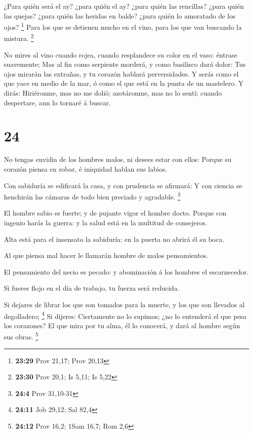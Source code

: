  ¿Para quién será el ay? ¿para quién el ay? ¿para quién las
rencillas? ¿para quién las quejas? ¿para quién las heridas en balde?
¿para quién lo amoratado de los ojos? \footnote{\textbf{23:29} Prov
  21,17; Prov 20,13}  Para los que se detienen mucho en el
vino, para los que van buscando la mistura. \footnote{\textbf{23:30}
  Prov 20,1; Is 5,11; Is 5,22}

 No mires al vino cuando rojea, cuando resplandece su color
en el vaso: éntrase suavemente;  Mas al fin como serpiente
morderá, y como basilisco dará dolor:  Tus ojos mirarán las
extrañas, y tu corazón hablará perversidades.  Y serás como
el que yace en medio de la mar, ó como el que está en la punta de un
mastelero.  Y dirás: Hiriéronme, mas no me dolió;
azotáronme, mas no lo sentí; cuando despertare, aun lo tornaré á buscar.

\hypertarget{section-23}{%
\section{24}\label{section-23}}

 No tengas envidia de los hombres malos, ni desees estar con
ellos:  Porque su corazón piensa en robar, é iniquidad
hablan sus labios.

 Con sabiduría se edificará la casa, y con prudencia se
afirmará:  Y con ciencia se henchirán las cámaras de todo
bien preciado y agradable. \footnote{\textbf{24:4} Prov 31,10-31}

 El hombre sabio es fuerte; y de pujante vigor el hombre
docto.  Porque con ingenio harás la guerra: y la salud está
en la multitud de consejeros.

 Alta está para el insensato la sabiduría: en la puerta no
abrirá él su boca.

 Al que piensa mal hacer le llamarán hombre de malos
pensamientos.

 El pensamiento del necio es pecado: y abominación á los
hombres el escarnecedor.

 Si fueres flojo en el día de trabajo, tu fuerza será
reducida.

 Si dejares de librar los que son tomados para la muerte, y
los que son llevados al degolladero; \footnote{\textbf{24:11} Job 29,12;
  Sal 82,4}  Si dijeres: Ciertamente no lo supimos; ¿no lo
entenderá el que pesa los corazones? El que mira por tu alma, él lo
conocerá, y dará al hombre según sus obras. \footnote{\textbf{24:12}
  Prov 16,2; 1Sam 16,7; Rom 2,6}

